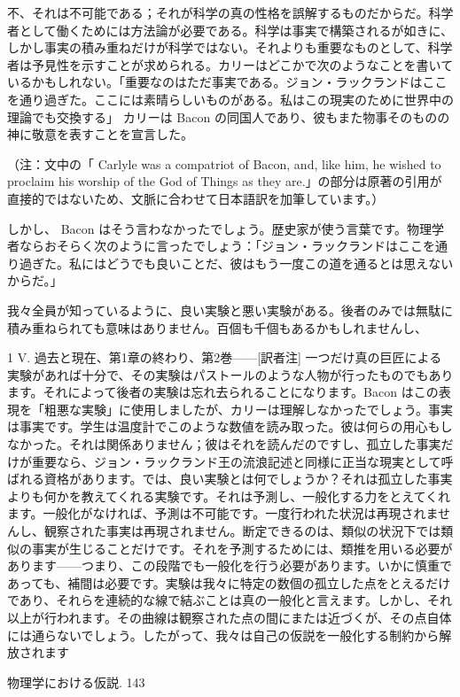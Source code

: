 \documentclass[a4paper,11pt,openany]{ltjsbook}
\begin{document}
不、それは不可能である；それが科学の真の性格を誤解するものだからだ。科学者として働くためには方法論が必要である。科学は事実で構築されるが如きに、しかし事実の積み重ねだけが科学ではない。それよりも重要なものとして、科学者は予見性を示すことが求められる。カリーはどこかで次のようなことを書いているかもしれない。「重要なのはただ事実である。ジョン・ラックランドはここを通り過ぎた。ここには素晴らしいものがある。私はこの現実のために世界中の理論でも交換する」 カリーは Bacon の同国人であり、彼もまた物事そのものの神に敬意を表すことを宣言した。

（注：文中の「 Carlyle was a compatriot of Bacon, and, like him, he wished to proclaim his worship of the God of Things as they are.」の部分は原著の引用が直接的ではないため、文脈に合わせて日本語訳を加筆しています。）

しかし、 Bacon はそう言わなかったでしょう。歴史家が使う言葉です。物理学者ならおそらく次のように言ったでしょう：「ジョン・ラックランドはここを通り過ぎた。私にはどうでも良いことだ、彼はもう一度この道を通るとは思えないからだ。」

我々全員が知っているように、良い実験と悪い実験がある。後者のみでは無駄に積み重ねられても意味はありません。百個も千個もあるかもしれませんし、

1 V. 過去と現在、第1章の終わり、第2巻——[訳者注] 一つだけ真の巨匠による実験があれば十分で、その実験はパストールのような人物が行ったものでもあります。それによって後者の実験は忘れ去られることになります。Bacon はこの表現を「粗悪な実験」に使用しましたが、カリーは理解しなかったでしょう。事実は事実です。学生は温度計でこのような数値を読み取った。彼は何らの用心もしなかった。それは関係ありません；彼はそれを読んだのですし、孤立した事実だけが重要なら、ジョン・ラックランド王の流浪記述と同様に正当な現実として呼ばれる資格があります。では、良い実験とは何でしょうか？それは孤立した事実よりも何かを教えてくれる実験です。それは予測し、一般化する力をとえてくれます。一般化がなければ、予測は不可能です。一度行われた状況は再現されませんし、観察された事実は再現されません。断定できるのは、類似の状況下では類似の事実が生じることだけです。それを予測するためには、類推を用いる必要があります——つまり、この段階でも一般化を行う必要があります。いかに慎重であっても、補間は必要です。実験は我々に特定の数個の孤立した点をとえるだけであり、それらを連続的な線で結ぶことは真の一般化と言えます。しかし、それ以上が行われます。その曲線は観察された点の間にまたは近づくが、その点自体には通らないでしょう。したがって、我々は自己の仮説を一般化する制約から解放されます

物理学における仮説. 143
\end{document}
